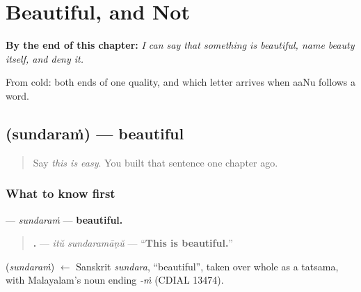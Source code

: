 
\chapter{Beautiful, and Not}
\label{ch:ml-beauty}

\begin{chapteropening}
\textbf{By the end of this chapter:} \emph{I can say that something is beautiful, name beauty itself, and deny it.}

From cold: both ends of one quality, and which letter arrives when aaNu follows a word.
\end{chapteropening}

\section[\texorpdfstring{\ml{സുന്ദരം} (sundaraṁ)}{സുന്ദരം (sundaraṁ)}]{ (sundaraṁ) — beautiful}

\label{lesson:ML-C97-sundaram}



\begin{quote}
Say \emph{this is easy}. You built that sentence one chapter ago.
\end{quote}

\subsection*{What to know first}
\textbf{} — \emph{sundaraṁ} — \textbf{beautiful.}

\begin{quote}
\textbf{ .} — \emph{itŭ sundaramāṇŭ} — \textquotedblleft{}\textbf{This is beautiful.}\textquotedblright{}
\end{quote}

\begin{cousinweb}
\textbf{} (\emph{sundaraṁ}) $\leftarrow$ Sanskrit \emph{sundara}, \textquotedblleft{}beautiful\textquotedblright{}, taken over whole as a tatsama, with Malayalam's noun ending \emph{-ṁ} (CDIAL 13474).
\end{cousinweb}

